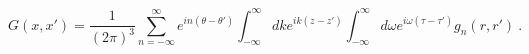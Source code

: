 \begin{equation}
G(x,x')=\frac1{(2\pi)^3}\sum_{n=-\infty}^\infty e^{in(\theta-\theta')}
\int_{-\infty}^\infty dk e^{ik(z-z')} \int_{-\infty}^{\infty} d\omega 
e^{i\omega (\tau-\tau')} g_n(r,r') \ .
\label{11}
\end{equation}

